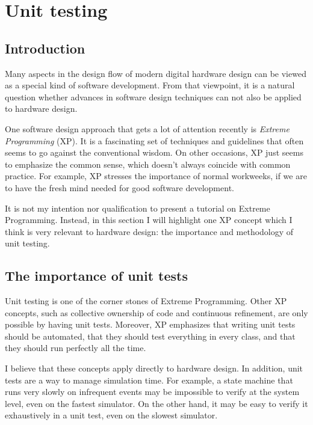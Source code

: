 \chapter{Unit testing \label{unittest}}

\section{Introduction \label{unittest-intro}}

Many aspects in the design flow of modern digital hardware design can
be viewed as a special kind of software development. From that
viewpoint, it is a natural question whether advances in software
design techniques can not also be applied to hardware design.

One software design approach that gets a lot of attention recently is
\emph{Extreme Programming} (XP). It is a fascinating set of techniques and
guidelines that often seems to go against the conventional wisdom. On
other occasions, XP just seems to emphasize the common sense, which
doesn't always coincide with common practice. For example, XP stresses
the importance of normal workweeks, if we are to have the
fresh mind needed for good software development.

It is not my intention nor qualification to present a tutorial on
Extreme Programming. Instead, in this section I will highlight one XP
concept which I think is very relevant to hardware design: the
importance and methodology of unit testing.

\section{The importance of unit tests \label{unittest-why}}

Unit testing is one of the corner stones of Extreme Programming. Other
XP concepts, such as collective ownership of code and continuous
refinement, are only possible by having unit tests. Moreover, XP
emphasizes that writing unit tests should be automated, that they should
test everything in every class, and that they should run perfectly all
the time. 

I believe that these concepts apply directly to hardware design. In
addition, unit tests are a way to manage simulation time. For example,
a state machine that runs very slowly on infrequent events may be
impossible to verify at the system level, even on the fastest
simulator. On the other hand, it may be easy to verify it exhaustively
in a unit test, even on the slowest simulator.

